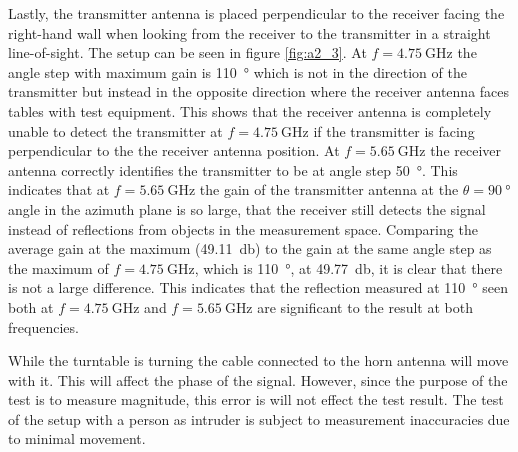 Lastly, the transmitter antenna is placed perpendicular to the receiver facing the right-hand wall when looking from the receiver to the transmitter in a straight line-of-sight. The setup can be seen in figure \ref{fig:a2_3}. At $f=\SI{4.75}{\giga\hertz}$ the angle step with maximum gain is \SI{110}{\degree} which is not in the direction of the transmitter but instead in the opposite direction where the receiver antenna faces tables with test equipment. This shows that the receiver antenna is completely unable to detect the transmitter at $f=\SI{4.75}{\giga\hertz}$ if the transmitter is facing perpendicular to the the receiver antenna position. At $f=\SI{5.65}{\giga\hertz}$ the receiver antenna correctly identifies the transmitter to be at angle step \SI{50}{\degree}. This indicates that at $f=\SI{5.65}{\giga\hertz}$ the gain of the transmitter antenna at the $\theta=\SI{90}{\degree}$ angle in the azimuth plane is so large, that the receiver still detects the signal instead of reflections from objects in the measurement space. Comparing the average gain at the maximum (\SI{49.11}{\decibel}) to the gain at the same angle step as the maximum of $f=\SI{4.75}{\giga\hertz}$, which is \SI{110}{\degree}, at \SI{49.77}{\decibel}, it is clear that there is not a large difference. This indicates that the reflection measured at \SI{110}{\degree} seen both at $f=\SI{4.75}{\giga\hertz}$ and $f=\SI{5.65}{\giga\hertz}$ are significant to the result at both frequencies.

While the turntable is turning the cable connected to the horn antenna will move with it. This will affect the phase of the signal. However, since the purpose of the test is to measure magnitude, this error is will not effect the test result. The test of the setup with a person as intruder is subject to measurement inaccuracies due to minimal movement.